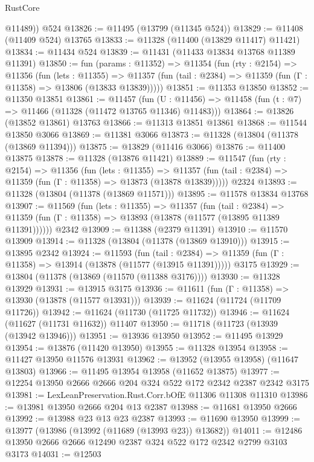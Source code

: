 \begin{lexlean}{RustCore}
\begin{coremodule}
        @11489))
    @524
@13826 := @11495 (@13799 (@11345 @524))
@13829 := @11408 (@11409 @524) @13765
@13833 := @11328 (@11400 (@13829 @11417) @11421)
@13834 := @11434 @524
@13839 := @11431 (@11433 @13834 @13768 @11389 @11391)
@13850 := fun (params : @11352) =>
  @11354
    (fun (rty : @2154) =>
    @11356
      (fun (lets : @11355) =>
      @11357 (fun (tail : @2384) => @11359 (fun (Γ : @11358) => @13806 (@13833 @13839)))))
@13851 := @11353 @13850
@13852 := @11350 @13851
@13861 := @11457
    (fun (U : @11456) => @11458 (fun (t : @7) => @11466 (@11328 (@11472 @13765 @11346) @11483)))
@13864 := @13826 (@13852 @13861) @13763
@13866 := @11313 @13851 @13861
@13868 := @11544 @13850 @3066
@13869 := @11381 @3066
@13873 := @11328 (@13804 (@11378 (@13869 @11394)))
@13875 := @13829 (@11416 @3066)
@13876 := @11400 @13875
@13878 := @11328 (@13876 @11421)
@13889 := @11547
    (fun (rty : @2154) =>
    @11356
      (fun (lets : @11355) =>
      @11357 (fun (tail : @2384) => @11359 (fun (Γ : @11358) => @13873 (@13878 @13839)))))
    @2324
@13893 := @11328 (@13804 (@11378 (@13869 @11571)))
@13895 := @11578 @13834 @13768
@13907 := @11569
    (fun (lets : @11355) =>
    @11357
      (fun (tail : @2384) =>
      @11359 (fun (Γ : @11358) => @13893 (@13878 (@11577 (@13895 @11389 @11391))))))
    @2342
@13909 := @11388 (@2379 @11391)
@13910 := @11570 @13909
@13914 := @11328 (@13804 (@11378 (@13869 @13910)))
@13915 := @13895 @2342
@13924 := @11593
    (fun (tail : @2384) => @11359 (fun (Γ : @11358) => @13914 (@13878 (@11577 (@13915 @11391)))))
    @3175
@13929 := @13804 (@11378 (@13869 (@11570 (@11388 @3176))))
@13930 := @11328 @13929
@13931 := @13915 @3175
@13936 := @11611 (fun (Γ : @11358) => @13930 (@13878 (@11577 @13931)))
@13939 := @11624 (@11724 (@11709 @11726))
@13942 := @11624 (@11730 (@11725 @11732))
@13946 := @11624 (@11627 (@11731 @11632)) @11407
@13950 := @11718 (@11723 (@13939 (@13942 @13946)))
@13951 := @13936 @13950
@13952 := @11495 @13929
@13954 := @13876 (@11420 @13950)
@13955 := @11328 @13954
@13958 := @11427 @13950 @11576 @13931
@13962 := @13952 (@13955 @13958) (@11647 @13803)
@13966 := @11495 @13954 @13958 (@11652 @13875)
@13977 := @12254 @13950 @2666 @2666 @204 @324 @522 @172 @2342 @2387 @2342 @3175
@13981 := LexLeanPreservation.Rust.Corr.bOfE @11306 @11308 @11310
@13986 := @13981 @13950 @2666 @204 @13 @2387
@13988 := @11681 @13950 @2666
@13992 := @13988 @23 @13 @23 @2387
@13993 := @11690 @13950
@13999 := @13977 (@13986 (@13992 (@11689 (@13993 @23)) @13682))
@14011 := @12486 @13950 @2666 @2666 @12490 @2387 @324 @522 @172 @2342 @2799 @3103 @3173
@14031 := @12503

\end{coremodule}
\end{lexlean}
